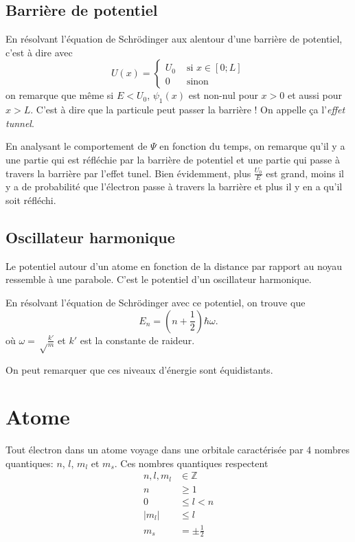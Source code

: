 \subsection{Barrière de potentiel}
En résolvant l'équation de Schrödinger
aux alentour d'une barrière de potentiel,
c'est à dire avec
\[ U(x) = \left\{
  \begin{aligned}
    U_0 & \text{ si } x \in [0; L]\\
    0 & \text{ sinon}
  \end{aligned}
\right. \]
on remarque que même si $E < U_0$,
$\psi_1(x)$ est non-nul pour $x > 0$ et aussi pour $x > L$.
C'est à dire que la particule peut passer la barrière !
On appelle ça l'\emph{effet tunnel}.

En analysant le comportement de $\Psi$ en fonction du temps,
on remarque qu'il y a
une partie qui est réfléchie par la barrière de potentiel et
une partie qui passe à travers la barrière par l'effet tunel.
Bien évidemment, plus $\frac{U_0}{E}$ est grand,
moins il y a de probabilité que l'électron passe à travers la barrière
et plus il y en a qu'il soit réfléchi.

\subsection{Oscillateur harmonique}
Le potentiel autour d'un atome en fonction de la distance
par rapport au noyau ressemble à une parabole.
C'est le potentiel d'un oscillateur harmonique.

En résolvant l'équation de Schrödinger avec ce potentiel,
on trouve que
\[ E_n = \left(n+\frac{1}{2}\right)\hbar\omega. \]
où $\omega = \sqrt\frac{k'}{m}$ et
$k'$ est la constante de raideur.

On peut remarquer que ces niveaux d'énergie sont équidistants.

\section{Atome}
Tout électron dans un atome voyage dans une orbitale caractérisée par
4 nombres quantiques: $n$, $l$, $m_l$ et $m_s$.
Ces nombres quantiques respectent
\begin{align*}
  n, l, m_l & \in \mathbb{Z}\\
  n & \geq 1\\
  0 & \leq l < n\\
  |m_l| & \leq l\\
  m_s & = \pm \frac12
\end{align*}

